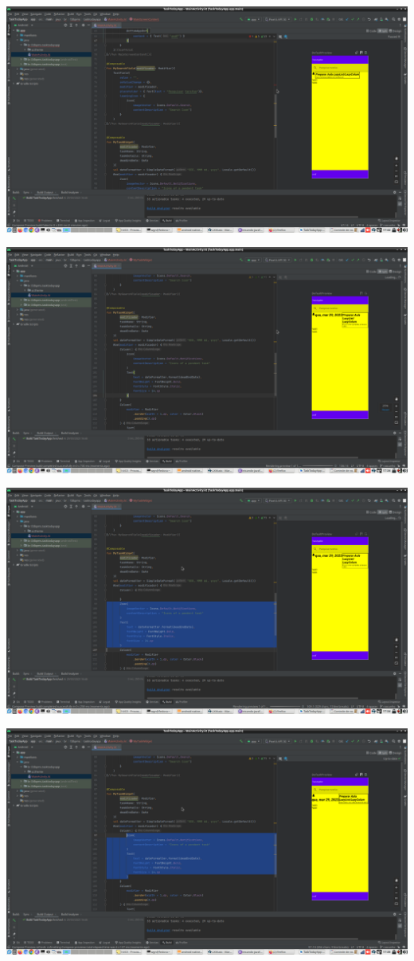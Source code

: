 \documentclass[11pt]{article}
\begin{document}
\begin{center}
\includegraphics[width=.9\linewidth]{./Captura de tela de 2023-03-29 17-33-00.png}
\end{center}
\begin{center}
\includegraphics[width=.9\linewidth]{./Captura de tela de 2023-03-29 17-34-38.png}
\end{center}
\begin{center}
\includegraphics[width=.9\linewidth]{./Captura de tela de 2023-03-29 17-34-52.png}
\end{center}
\begin{center}
\includegraphics[width=.9\linewidth]{./Captura de tela de 2023-03-29 17-35-07.png}
\end{center}
\end{document}
